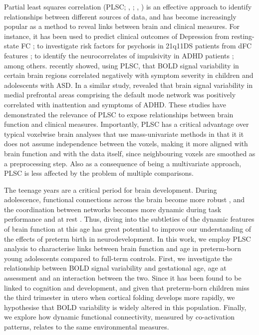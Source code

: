       Partial least squares correlation (PLSC; \citeauthor{McIntosh2004}, \citeyear{McIntosh2004}; \citeauthor{Krishnan2011}, \citeyear{Krishnan2011})  is an effective approach to identify relationships between different sources of data, and has become increasingly popular as a method to reveal links between brain and clinical measures. For instance, it has been used to predict clinical outcomes of Depression from resting-state FC \citep{Yoshida2017}; to investigate risk factors for psychosis in 21q11DS patients from dFC features \citep{Zoller2019}; to identify the neurocorrelates of impulsivity in ADHD patients \citep{Barker2019}; among others. \cite{Easson2019} recently showed, using PLSC, that BOLD signal variability in certain brain regions correlated negatively with symptom severity in children and adolescents with ASD. In a similar study, \citep{Nomi2018} revealed that brain signal variability in medial prefrontal areas comprising the default mode network was positively correlated with inattention and symptoms of ADHD. These studies have demonstrated the relevance of PLSC to expose relationships between brain function and clinical measures. Importantly, PLSC has a critical advantage over typical voxelwise brain analyses that use mass-univariate methods in that it it does not assume independence between the voxels, making it more aligned with brain function and with the data itself, since neighbouring voxels are smoothed as a preprocessing step. Also as a consequence of being a multivariate approach, PLSC is less affected by the problem of multiple comparisons. 
      
  
     The teenage years are a critical period for brain development. During adolescence, functional connections across the brain become more robust \citep{Power2010}, and the coordination between networks becomes more dynamic during task performance \citep{Hutchison2015} and at rest \citep{Marusak2017, Faghiri2018}. Thus, diving into the subtleties of the dynamic features of brain function at this age has great potential to improve our understanding of the effects of preterm birth in neurodevelopment. In this work, we employ PLSC analysis to characterise links between brain function and age in preterm-born young adolescents compared to full-term controls. First, we investigate the relationship between BOLD signal variability and gestational age, age at assessment and an interaction between the two. Since it has been found to be linked to cognition and development, and given that preterm-born children miss the third trimester in utero when cortical folding develops more rapidly, we hypothesise that BOLD variability is widely altered in this population. Finally, we explore how dynamic functional connectivity, measured by co-activation patterns, relates to the same environmental measures. 




